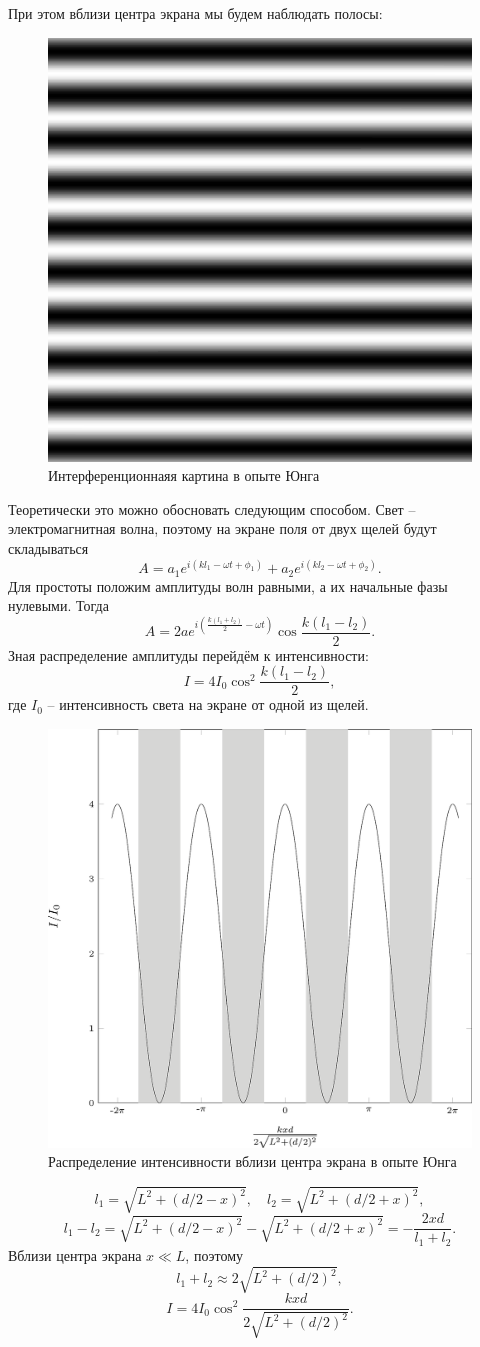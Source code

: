 При этом вблизи центра экрана мы будем наблюдать полосы:
\begin{figure}[h!]
\center
\includegraphics[width=.2\textwidth]{2015-10-12-difraction-young.png}
\caption{Интерференционнаяя картина в опыте Юнга}
\end{figure}

Теоретически это можно обосновать следующим способом. Свет -- электромагнитная волна, поэтому на экране поля от двух щелей будут складываться
\[
    A = a_1 e^{i(kl_1 - \omega t + \phi_1)} + a_2 e^{i(kl_2 - \omega t + \phi_2)}.
\]
Для простоты положим амплитуды волн равными, а их начальные фазы нулевыми. Тогда
\[
    A = 2a e^{i\left(\frac{k(l_1+l_2)}{2}-\omega t\right)} \cos\frac{k(l_1-l_2)}{2}.
\]
Зная распределение амплитуды перейдём к интенсивности:
\[
    I = 4I_0\cos^2\frac{k(l_1-l_2)}{2}, 
\]
где \( I_0 \) -- интенсивность света на экране от одной из щелей.
\begin{figure}[h!]
    \center
    \includegraphics[width=.7\textwidth]{2015-10-12-difraction-inter.png}
    \caption{Распределение интенсивности вблизи центра экрана в опыте Юнга}
\end{figure}
\[
    l_1 = \sqrt{L^2 + (d/2 - x)^2},\quad l_2 = \sqrt{L^2 + (d/2 + x)^2},
\]
\[
    l_1 - l_2 = \sqrt{L^2 + (d/2 - x)^2} - \sqrt{L^2 + (d/2 + x)^2} = -\frac{2xd}{l_1 + l_2}.
\]
Вблизи центра экрана \( x \ll L \), поэтому
\[
    l_1 + l_2 \approx 2\sqrt{L^2 + (d/2)^2},
\]
\[
    I = 4I_0\cos^2\frac{kxd}{2\sqrt{L^2 + (d/2)^2}}. 
\]


